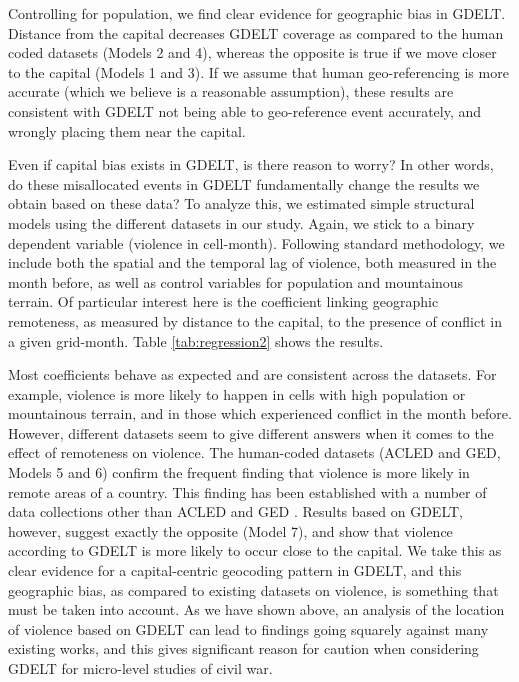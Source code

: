 \documentclass[hidelinks]{article}
\begin{document}
Controlling for population, we find clear evidence for geographic bias in GDELT. Distance from the capital decreases GDELT coverage as compared to the human coded datasets (Models 2 and 4), whereas the opposite is true if we move closer to the capital (Models 1 and 3). If we assume that human geo-referencing is more accurate (which we believe is a reasonable assumption), these results are consistent with GDELT not being able to geo-reference event accurately, and wrongly placing them near the capital. 

Even if capital bias exists in GDELT, is there reason to worry? In other words, do these misallocated events in GDELT fundamentally change the results we obtain based on these data? To analyze this, we estimated simple structural models using the different datasets in our study. Again, we stick to a binary dependent variable (violence in cell-month). Following standard methodology, we include both the spatial and the temporal lag of violence, both measured in the month before, as well as control variables for population and mountainous terrain. Of particular interest here is the coefficient linking geographic remoteness, as measured by distance to the capital, to the presence of conflict in a given grid-month. Table \ref{tab:regression2} shows the results. 

Most coefficients behave as expected and are consistent across the datasets. For example, violence is more likely to happen in cells with high population or mountainous terrain, and in those which experienced conflict in the month before. However, different datasets seem to give different answers when it comes to the effect of remoteness on violence. The human-coded datasets (ACLED and GED, Models 5 and 6) confirm the frequent finding that violence is more likely in remote areas of a country. This finding has been established with a number of data collections other than ACLED and GED \citep{buhaug06localdeterminants, buhaug08disaggregating}. Results based on GDELT, however, suggest exactly the opposite (Model 7), and show that violence according to GDELT is more likely to occur close to the capital. We take this as clear evidence for a capital-centric geocoding pattern in GDELT, and this geographic bias, as compared to existing datasets on violence, is something that must be taken into account. As we have shown above, an analysis of the location of violence based on GDELT can lead to findings going squarely against many existing works, and this gives significant reason for caution when considering GDELT for micro-level studies of civil war.
\end{document}

